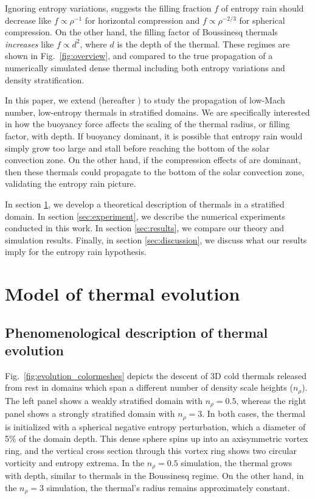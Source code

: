 \documentclass[twocolumn, amsmath, amsfonts, amssymb, trackchanges]{aastex62}
\newcommand{\LJ}{\citetalias{lecoanet&jeevanjee2018}}
\begin{document}
Ignoring entropy variations, \citet{brandenburg2016} suggests the filling fraction $f$ of entropy rain should decrease like $f \propto \rho^{-1}$ for horizontal compression and $f \propto \rho^{-2/3}$ for spherical compression.
On the other hand, the filling factor of Boussinesq thermals \emph{increases} like $f \propto d^2$, where $d$ is the depth of the thermal.
These regimes are shown in Fig.~\ref{fig:overview}, and compared to the true propagation of a numerically simulated dense thermal including both entropy variations and density stratification.

In this paper, we extend \citet{lecoanet&jeevanjee2018} (hereafter \LJ) to study the propagation of low-Mach number, low-entropy thermals in stratified domains. 
We are specifically interested in how the buoyancy force affects the scaling of the thermal radius, or filling factor, with depth. 
If buoyancy dominant, it is possible that entropy rain would simply grow too large and stall before reaching the bottom of the solar convection zone.
On the other hand, if the compression effects of \citet{brandenburg2016} are dominant, then these thermals could propagate to the bottom of the solar convection zone, validating the entropy rain picture.

In section \ref{sec:theory}, we develop a theoretical description of thermals in a stratified domain. 
In section \ref{sec:experiment}, we describe the numerical experiments conducted in this work. 
In section \ref{sec:results}, we compare our theory and simulation results. 
Finally, in section \ref{sec:discussion}, we discuss what our results imply for the entropy rain hypothesis.

\section{Model of thermal evolution}
\label{sec:theory}

\subsection{Phenomenological description of thermal evolution}
Fig.~\ref{fig:evolution_colormeshes} depicts the descent of 3D cold thermals released from rest in domains which span a different number of density scale heights ($n_\rho$).
The left panel shows a weakly stratified domain with $n_\rho=0.5$, whereas the right panel shows a strongly stratified domain with $n_\rho=3$.
In both cases, the thermal is initialized with a spherical negative entropy perturbation, which a diameter of 5\% of the domain depth.
This dense sphere spins up into an axisymmetric vortex ring, and the vertical cross section through this vortex ring shows two circular vorticity and entropy extrema.
In the $n_\rho = 0.5$ simulation, the thermal grows with depth, similar to thermals in the Boussinesq regime.
On the other hand, in the $n_\rho = 3$ simulation, the thermal's radius remains approximately constant.
\end{document}
